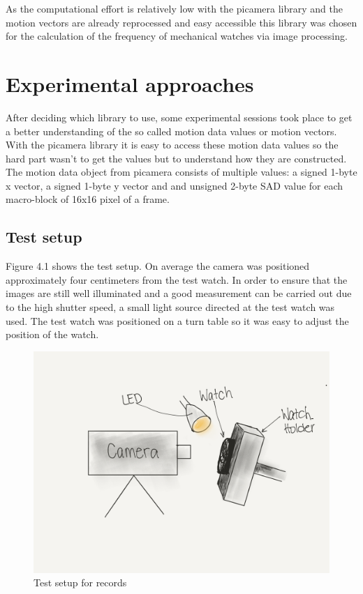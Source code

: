 \documentclass[12pt, a4paper]{report}
\begin{document}
    As the computational effort is relatively low with the picamera library and the motion vectors are already reprocessed and easy accessible this library was chosen for the calculation of the frequency of mechanical watches via image processing.

    \chapter {Experimental approaches}

    After deciding which library to use, some experimental sessions took place to get a better understanding of the so called motion data values or motion vectors. 
    With the picamera library it is easy to access these motion data values so the hard part wasn't to get the values but to understand how they are constructed. 
    The motion data object from picamera consists of multiple values: a signed 1-byte x vector, a signed 1-byte y vector and and unsigned 2-byte SAD value for each macro-block of 16x16 pixel of a frame.
    
   \section{Test setup}
   
Figure 4.1 shows the test setup. On average the camera was positioned approximately four centimeters from the test watch. In order to ensure that the images are still well illuminated and a good measurement can be carried out due to the high shutter speed, a small light source directed at the test watch was used. The test watch was positioned on a turn table so it was easy to adjust the position of the watch.

      \begin{figure}[H]
        \centering
        \includegraphics[scale=0.1]{Images/test_setup}
        
        \caption{Test setup for records}
        \end{figure}
        
\end{document}
